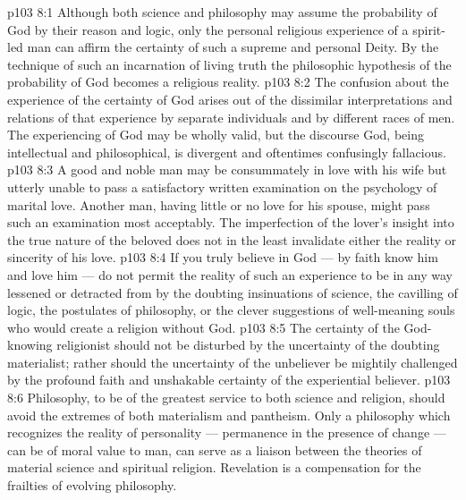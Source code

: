 \vs p103 8:1 Although both science and philosophy may assume the probability of God by their reason and logic, only the personal religious experience of a spirit\hyp{}led man can affirm the certainty of such a supreme and personal Deity. By the technique of such an incarnation of living truth the philosophic hypothesis of the probability of God becomes a religious reality.
\vs p103 8:2 The confusion about the experience of the certainty of God arises out of the dissimilar interpretations and relations of that experience by separate individuals and by different races of men. The experiencing of God may be wholly valid, but the discourse  God, being intellectual and philosophical, is divergent and oftentimes confusingly fallacious.
\vs p103 8:3 A good and noble man may be consummately in love with his wife but utterly unable to pass a satisfactory written examination on the psychology of marital love. Another man, having little or no love for his spouse, might pass such an examination most acceptably. The imperfection of the lover’s insight into the true nature of the beloved does not in the least invalidate either the reality or sincerity of his love.
\vs p103 8:4 \pc If you truly believe in God --- by faith know him and love him --- do not permit the reality of such an experience to be in any way lessened or detracted from by the doubting insinuations of science, the cavilling of logic, the postulates of philosophy, or the clever suggestions of well\hyp{}meaning souls who would create a religion without God.
\vs p103 8:5 The certainty of the God\hyp{}knowing religionist should not be disturbed by the uncertainty of the doubting materialist; rather should the uncertainty of the unbeliever be mightily challenged by the profound faith and unshakable certainty of the experiential believer.
\vs p103 8:6 \pc Philosophy, to be of the greatest service to both science and religion, should avoid the extremes of both materialism and pantheism. Only a philosophy which recognizes the reality of personality --- permanence in the presence of change --- can be of moral value to man, can serve as a liaison between the theories of material science and spiritual religion. Revelation is a compensation for the frailties of evolving philosophy.
